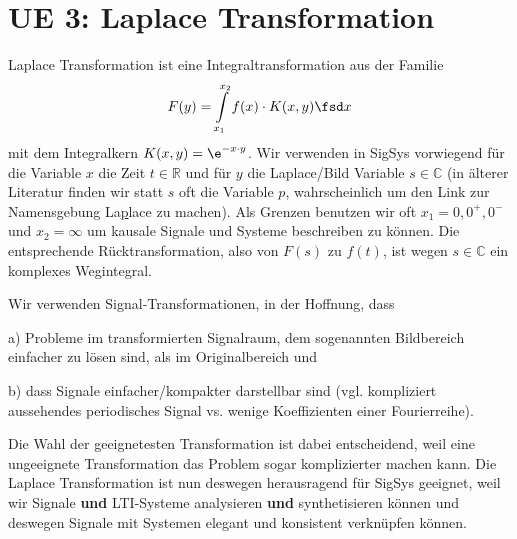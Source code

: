 \clearpage
\section{UE 3: Laplace Transformation}
\label{sec:ue3_laplace}
%
Laplace Transformation ist eine Integraltransformation aus der Familie
\begin{equation}
F(y) = \int\limits_{x_1}^{x_2} f(x) \cdot K(x,y) \fsd x
\end{equation}
mit dem Integralkern $K(x,y) = \e^{-x \cdot y}$.
Wir verwenden in SigSys vorwiegend für die Variable $x$ die Zeit $t\in\mathbb{R}$ und für
$y$ die Laplace/Bild Variable $s\in\mathbb{C}$ (in älterer Literatur finden
wir statt $s$ oft die Variable $p$, wahrscheinlich um den Link zur Namensgebung
La\underline{p}lace zu machen).
Als Grenzen benutzen wir oft $x_1={0,0^+,0^-}$ und $x_2=\infty$ um kausale Signale und
Systeme beschreiben zu können.
%
Die entsprechende Rücktransformation, also von $F(s)$ zu $f(t)$, ist wegen $s\in\mathbb{C}$ ein komplexes Wegintegral.

Wir verwenden Signal-Transformationen, in der Hoffnung, dass

\noindent a) Probleme im
transformierten Signalraum, dem sogenannten Bildbereich einfacher zu lösen
sind, als im Originalbereich und

\noindent b) dass Signale einfacher/kompakter darstellbar
sind (vgl. kompliziert aussehendes periodisches Signal vs. wenige Koeffizienten einer Fourierreihe).
%

Die Wahl der geeignetesten Transformation ist dabei entscheidend, weil eine
ungeeignete Transformation das Problem sogar komplizierter machen kann.
%
Die Laplace Transformation ist nun deswegen herausragend für SigSys geeignet, weil
wir Signale \textbf{und} LTI-Systeme analysieren \textbf{und} synthetisieren
können und deswegen Signale mit Systemen elegant und konsistent verknüpfen können.

